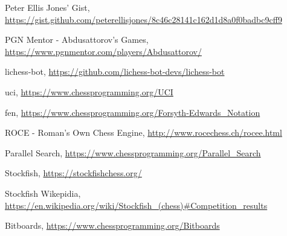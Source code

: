 \documentclass[sigconf]{acmart}
\begin{document}
\begin{thebibliography}{9}
     Peter Ellis Jones' Gist,  
        \url{https://gist.github.com/peterellisjones/8c46c28141c162d1d8a0f0badbc9cff9}
    
     PGN Mentor - Abdusattorov's Games,  
        \url{https://www.pgnmentor.com/players/Abdusattorov/}
        
     lichess-bot,  
        \url{https://github.com/lichess-bot-devs/lichess-bot}
        
     uci,  
        \url{https://www.chessprogramming.org/UCI}
    
     fen,  
        \url{https://www.chessprogramming.org/Forsyth-Edwards_Notation}
        
     ROCE - Roman's Own Chess Engine,  
        \url{http://www.rocechess.ch/rocee.html}
        
     Parallel Search,  
        \url{https://www.chessprogramming.org/Parallel_Search}
        
     Stockfish,  
        \url{https://stockfishchess.org/}

     Stockfish Wikepidia,  
        \url{https://en.wikipedia.org/wiki/Stockfish_(chess)#Competition_results}
        
     Bitboards,
        \url{https://www.chessprogramming.org/Bitboards}
        
\end{thebibliography}
\end{document}
